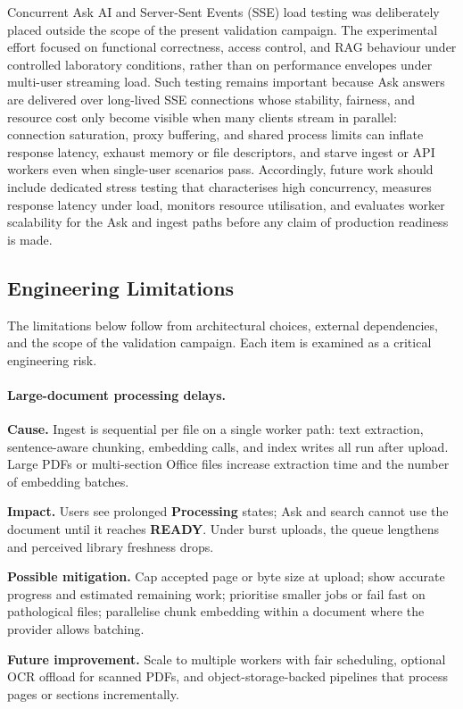 Concurrent Ask AI and Server-Sent Events (SSE) load testing was deliberately
placed outside the scope of the present validation campaign. The experimental
effort focused on functional correctness, access control, and RAG behaviour under
controlled laboratory conditions, rather than on performance envelopes under
multi-user streaming load. Such testing remains important because Ask answers are
delivered over long-lived SSE connections whose stability, fairness, and resource
cost only become visible when many clients stream in parallel: connection
saturation, proxy buffering, and shared process limits can inflate response
latency, exhaust memory or file descriptors, and starve ingest or API workers
even when single-user scenarios pass. Accordingly, future work should include
dedicated stress testing that characterises high concurrency, measures response
latency under load, monitors resource utilisation, and evaluates worker
scalability for the Ask and ingest paths before any claim of production readiness
is made.

\subsection{Engineering Limitations}

The limitations below follow from architectural choices, external dependencies,
and the scope of the validation campaign. Each item is examined as a critical
engineering risk.

\paragraph{Large-document processing delays.}
\noindent\textbf{Cause.} Ingest is sequential per file on a single worker path:
text extraction, sentence-aware chunking, embedding calls, and index writes all
run after upload. Large PDFs or multi-section Office files increase extraction
time and the number of embedding batches.\par\vspace{0.15em}
\noindent\textbf{Impact.} Users see prolonged \textbf{Processing} states; Ask and
search cannot use the document until it reaches \textbf{READY}. Under burst
uploads, the queue lengthens and perceived library freshness drops.\par\vspace{0.15em}
\noindent\textbf{Possible mitigation.} Cap accepted page or byte size at upload;
show accurate progress and estimated remaining work; prioritise smaller jobs or
fail fast on pathological files; parallelise chunk embedding within a document
where the provider allows batching.\par\vspace{0.15em}
\noindent\textbf{Future improvement.} Scale to multiple workers with fair
scheduling, optional OCR offload for scanned PDFs, and object-storage-backed
pipelines that process pages or sections incrementally.
\par\vspace{0.35em}
